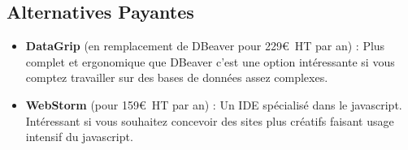 \subsection{Alternatives Payantes}

\begin{itemize}
	\item \textbf{DataGrip} (en remplacement de DBeaver pour 229\euro\ HT par an) : Plus complet et ergonomique que DBeaver c'est une option intéressante si vous comptez travailler sur des bases de données assez complexes.
	\item \textbf{WebStorm} (pour 159\euro\ HT par an) : Un IDE spécialisé dans le javascript. Intéressant si vous souhaitez concevoir des sites plus créatifs faisant usage intensif du javascript.
\end{itemize}
